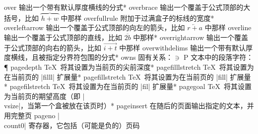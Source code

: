 \capcs over {输出一个带有默认厚度横线的分式}*{}
\capcs overbrace {输出一个覆盖于公式顶部的大括号，比如 $\overbrace{h+w}{}$ 中那样}{}{}
\capcs overfullrule {附加于过满盒子的标线的宽度}*{}
\capcs overleftarrow {输出一个覆盖于公式顶部的向左的箭头，比如 $\overleftarrow{r+a}$ 中那样}{}{}
\capcs overline {输出一个覆盖于公式顶部的直线，比如 $\overline{2b}$ 中那样}*{}
\capcs overrightarrow {输出一个覆盖于公式顶部的向右的箭头，比如 $\overrightarrow{i+t}$ 中那样}{}{}
\capcs overwithdelims {输出一个带有默认厚度横线，且被指定分界符包围的分式}*{}
\capcs owns {固有关系：$\owns$}{}{}
\capcs P {文本中的段落字符：\P}{}{}
\capcs pagedepth {\TeX\ 将其设置为当前页的尖前深度}*{}
\capcs pagefilllstretch {\TeX\ 将其设置为在当前页的 |filll| 扩展量}*{}
\capcs pagefillstretch {\TeX\ 将其设置为在当前页的 |fill| 扩展量}*{}
\capcs pagefilstretch {\TeX\ 将其设置为在当前页的 |fil| 扩展量}*{}
\capcs pagegoal {\TeX\ 将其设置为当前页的期望高度（即 |\\vsize|，当第一个盒被放在该页时）}*{}
\capcs pageinsert {在随后的页面输出指定的文本，并用完整页}{}{}
\capcs pageno {|\\count0| 寄存器，它包括（可能是负的）页码}{}{}
